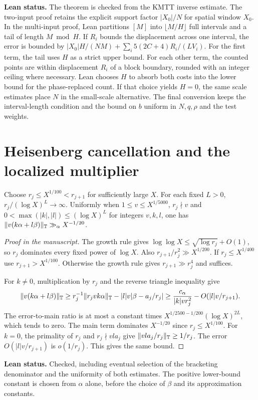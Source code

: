 \noindent\textbf{Lean status.} The theorem is checked from the
KMTT inverse estimate. The two-input proof retains the explicit support
factor $|X_0|/N$ for spatial window $X_0$. In the multi-input proof,
Lean partitions $[M]$ into $\lfloor M/H\rfloor$ full
intervals and a tail of length $M\bmod H$. If $R_i$ bounds the
displacement across one interval, the error is bounded by
$|X_0|H/(NM)+\sum_i 5(2C+4)R_i/(LV_i)$. For the first term,
the tail uses $H$ as a strict upper bound. For each other term,
the counted points are within displacement $R_i$ of a block
boundary, rounded with an integer ceiling where necessary.
Lean chooses $H$ to absorb both costs into the lower bound for
the phase-replaced count. If that choice yields $H=0$, the same
scale estimates place $N$ in the small-scale alternative. The final
conversion keeps the interval-length condition and the bound on $b$
uniform in $N,q,\rho$ and the test weights.

\section{Heisenberg cancellation and the localized multiplier}

\begin{lemma}\label{l:heisenberg-horizontal}
\leanok
{}
Choose $r_j\le X^{1/100}<r_{j+1}$ for sufficiently large $X$.
For each fixed $L>0$, $r_j/(\log X)^L\to\infty$.
Uniformly when $1\le v\le X^{1/5000}$, $r_j\nmid v$ and
$0<\max(|k|,|l|)\le(\log X)^L$ for integers $v,k,l$, one has
$\lVert v(k\alpha+l\beta)\rVert_{\mathbb T}\gg_\alpha X^{-1/20}$.
\end{lemma}
\begin{proof}[Proof in the manuscript]
\leanok
The growth rule gives $\log\log X\le\sqrt{\log r_j}+O(1)$,
so $r_j$ dominates every fixed power of $\log X$.
Also $r_{j+1}/r_j^2\gg X^{1/200}$.
If $r_j\le X^{1/400}$ use $r_{j+1}>X^{1/100}$.
Otherwise the growth rule gives $r_{j+1}\gg r_j^4$ and suffices.

For $k\ne0$, multiplication by $r_j$ and the reverse triangle
inequality give
\[
 \lVert v(k\alpha+l\beta)\rVert_{\mathbb T}
 \ge r_j^{-1}\lVert r_jvk\alpha\rVert_{\mathbb T}
       -|l|v|\beta-a_j/r_j|
 \ge\frac{c_\alpha}{|k|v r_j^2}-O(|l|v/r_{j+1}).
\]
The error-to-main ratio is at most a constant times
$X^{1/2500-1/200}(\log X)^{2L}$, which tends to zero. The main term
dominates $X^{-1/20}$ since $r_j\le X^{1/100}$.
For $k=0$, the primality of $r_j$ and $r_j\nmid vla_j$ give
$\lVert vla_j/r_j\rVert_{\mathbb T}\ge1/r_j$. The error
$O(|l|v/r_{j+1})$ is $o(1/r_j)$. This gives the same bound.
\end{proof}
\noindent\textbf{Lean status.} Checked, including eventual selection
of the bracketing denominator and the uniformity of both estimates.
The positive lower-bound constant is chosen from $\alpha$ alone,
before the choice of $\beta$ and its approximation constants.

